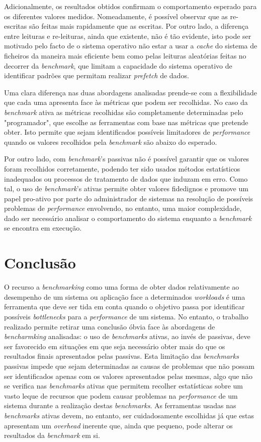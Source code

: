 \documentclass{article}
\begin{document}
Adicionalmente, os resultados obtidos confirmam o comportamento esperado para os diferentes valores medidos. Nomeadamente, é possível observar
que as re-escritas são feitas mais rapidamente que as escritas. Por outro lado, a diferença entre leituras e re-leituras, ainda que existente, não é
tão evidente, isto pode ser motivado pelo facto de o sistema operativo não estar a usar a \textit{cache} do sistema de ficheiros da maneira mais eficiente
bem como pelas leituras aleatórias feitas no decorrer da \textit{benchmark}, que limitam a capacidade do sistema operativo de identificar padrões que permitam
realizar \textit{prefetch} de dados.

Uma clara diferença nas duas abordagens analisadas prende-se com a flexibilidade que cada uma apresenta face às métricas que podem ser recolhidas. No caso da \textit{benchmark}
ativa as métricas recolhidas são completamente determinadas pelo "programador", que escolhe as ferramentas com base nas métricas que pretende obter. Isto permite que sejam
identificados possíveis limitadores de \textit{performance} quando os valores recolhidos pela \textit{benchmark} são abaixo do esperado. 

Por outro lado, com \textit{benchmark}'s passivas não é possível garantir que os valores foram recolhidos corretamente, podendo ter sido usados métodos estatísticos inadequados 
ou processos de tratamento de dados que induzam em erro. Como tal, o uso de \textit{benchmark}'s ativas permite obter valores fidedignos e promove um papel pro-ativo por parte 
do administrador de sistemas na resolução de possíveis problemas de \textit{performance} envolvendo, no entanto, uma maior complexidade, dado ser necessário analisar o comportamento 
do sistema enquanto a \textit{benchmark} se encontra em execução.

\section{Conclusão}
O recurso a \textit{benchmarking} como uma forma de obter dados relativamente ao desempenho de um sistema ou aplicação face a determinados \textit{workloads} é uma ferramenta que 
deve ser tida em conta quando o objetivo passa por identificar possíveis \textit{bottlenecks} para a \textit{performance} de um sistema. No entanto, o trabalho realizado permite
retirar uma conclusão óbvia face às abordagens de \textit{bencharmking} analisadas: o uso de \textit{benchmarks} ativas, ao invés de passivas, deve ser favorecido em situações em que
seja necessário obter mais do que os resultados finais apresentados pelas passivas. Esta limitação das \textit{benchmarks} passivas impede que sejam determinadas as causas de problemas
que não possam ser identificados apenas com os valores apresentados pelas mesmas, algo que não se verifica nas \textit{benchmarks} ativas que permitem recolher estatísticas sobre um 
vasto leque de recursos que podem causar problemas na \textit{performance} de um sistema durante a realização destas \textit{benchmarks}.
As ferramentas usadas nas \textit{benchmarks} ativas devem, no entanto, ser cuidadosamente escolhidas já que estas apresentam um \textit{overhead} inerente que, ainda que pequeno, pode
alterar os resultados da \textit{benchmark} em si.
\end{document}
